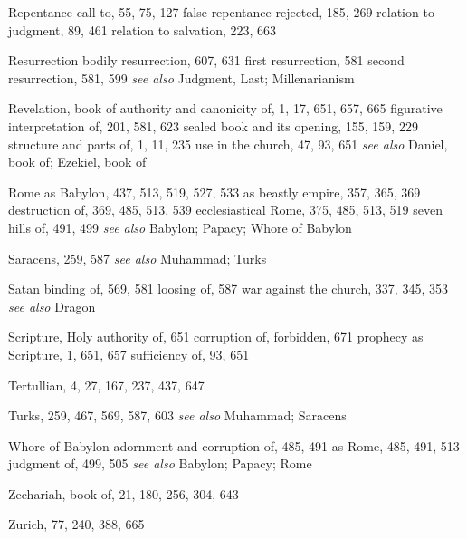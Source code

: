 \begin{theindex}
\indexspace

\item Repentance
\subitem call to, 55, 75, 127
\subitem false repentance rejected, 185, 269
\subitem relation to judgment, 89, 461
\subitem relation to salvation, 223, 663
\item Resurrection
\subitem bodily resurrection, 607, 631
\subitem first resurrection, 581
\subitem second resurrection, 581, 599
\subitem \emph{see also} Judgment, Last; Millenarianism
\item Revelation, book of
\subitem authority and canonicity of, 1, 17, 651, 657, 665
\subitem figurative interpretation of, 201, 581, 623
\subitem sealed book and its opening, 155, 159, 229
\subitem structure and parts of, 1, 11, 235
\subitem use in the church, 47, 93, 651
\subitem \emph{see also} Daniel, book of; Ezekiel, book of
\item Rome
\subitem as Babylon, 437, 513, 519, 527, 533
\subitem as beastly empire, 357, 365, 369
\subitem destruction of, 369, 485, 513, 539
\subitem ecclesiastical Rome, 375, 485, 513, 519
\subitem seven hills of, 491, 499
\subitem \emph{see also} Babylon; Papacy; Whore of Babylon

\indexspace

\item Saracens, 259, 587
\subitem \emph{see also} Muhammad; Turks
\item Satan
\subitem binding of, 569, 581
\subitem loosing of, 587
\subitem war against the church, 337, 345, 353
\subitem \emph{see also} Dragon
\item Scripture, Holy
\subitem authority of, 651
\subitem corruption of, forbidden, 671
\subitem prophecy as Scripture, 1, 651, 657
\subitem sufficiency of, 93, 651

\indexspace

\item Tertullian, 4, 27, 167, 237, 437, 647
\item Turks, 259, 467, 569, 587, 603
\subitem \emph{see also} Muhammad; Saracens

\indexspace

\item Whore of Babylon
\subitem adornment and corruption of, 485, 491
\subitem as Rome, 485, 491, 513
\subitem judgment of, 499, 505
\subitem \emph{see also} Babylon; Papacy; Rome

\indexspace

\item Zechariah, book of, 21, 180, 256, 304, 643
\item Zurich, 77, 240, 388, 665

\end{theindex}
